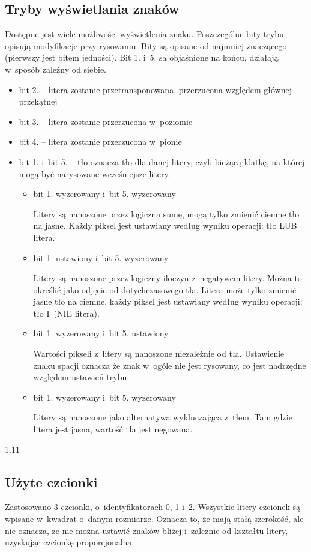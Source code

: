 \subsection{Tryby wyświetlania znaków}
Dostępne jest wiele możliwości wyświetlenia znaku. Poszczególne bity trybu opisują modyfikacje przy rysowaniu. Bity są opisane od najmniej znaczącego (pierwszy jest bitem jedności). Bit 1. i~5. są objaśnione na końcu, działają w~sposób zależny od siebie.
\begin{itemize}
\item bit 2. – litera zostanie przetransponowana, przerzucona względem głównej przekątnej
\item bit 3. – litera zostanie przerzucona w~poziomie
\item bit 4. – litera zostanie przerzucona w~pionie
\item bit 1. i~bit 5. – tło oznacza tło dla danej litery, czyli bieżącą klatkę, na której mogą być narysowane wcześniejsze litery.
\begin{itemize}
\item bit 1. wyzerowany i~bit 5. wyzerowany

Litery są nanoszone przez logiczną sumę, mogą tylko zmienić ciemne tło na jasne. Każdy piksel jest ustawiany według wyniku operacji: tło LUB litera.
\item bit 1. ustawiony i~bit 5. wyzerowany

Litery są nanoszone przez logiczny iloczyn z~negatywem litery. Można to określić jako odjęcie od dotychczasowego tła. Litera może tylko zmienić jasne tło na ciemne, każdy piksel jest ustawiany według wyniku operacji: tło I~(NIE litera).
\item bit 1. wyzerowany i~bit 5. ustawiony

Wartości pikseli z~litery są nanoszone niezależnie od tła. Ustawienie znaku spacji oznacza że znak w~ogóle nie jest rysowany, co jest nadrzędne względem ustawień trybu.
\item bit 1. wyzerowany i~bit 5. wyzerowany

Litery są nanoszone jako alternatywa wykluczająca z~tłem. Tam gdzie litera jest jasna, wartość tła jest negowana.
\end{itemize}
\end{itemize}

1.11
\subsection{Użyte czcionki}
Zastosowano 3 czcionki, o~identyfikatorach 0, 1 i~2. Wszystkie litery czcionek są wpisane w~kwadrat o~danym rozmiarze. Oznacza to, że mają stałą szerokość, ale nie oznacza, ze nie można ustawić znaków bliżej i~zależnie od kształtu litery, uzyskując czcionkę proporcjonalną.

